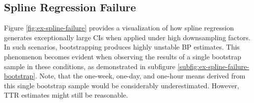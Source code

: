 \subsection{Spline Regression  Failure}

Figure \ref{fig:ex-spline-failure} provides a visualization of how
spline regression generates exceptionally large CIs when
applied under high downsampling factors.
In such scenarios, bootstrapping produces highly unstable BP estimates.
This phenomenon becomes evident when observing the results of a single bootstrap
sample in these conditions, as demonstrated in subfigure \ref{subfig:ex-spline-failure-bootstrap}.
Note, that the one-week, one-day, and one-hour means derived from this single bootstrap sample
would be considerably underestimated.
However, TTR estimates might still be reasonable.

